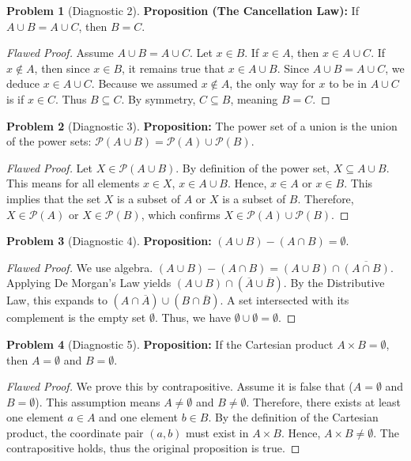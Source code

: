 \documentclass[11pt]{article}
\theoremstyle{definition}
\newtheorem{problem}{Problem}
\begin{document}
\begin{problem}[Diagnostic 2]
\textbf{Proposition (The Cancellation Law):} If $A \cup B = A \cup C$, then $B = C$.
\begin{proof}[Flawed Proof]
Assume $A \cup B = A \cup C$. Let $x \in B$. If $x \in A$, then $x \in A \cup C$. If $x \notin A$, then since $x \in B$, it remains true that $x \in A \cup B$. Since $A \cup B = A \cup C$, we deduce $x \in A \cup C$. Because we assumed $x \notin A$, the only way for $x$ to be in $A \cup C$ is if $x \in C$. Thus $B \subseteq C$. By symmetry, $C \subseteq B$, meaning $B = C$.
\end{proof}
\end{problem}

\begin{problem}[Diagnostic 3]
\textbf{Proposition:} The power set of a union is the union of the power sets: $\mathcal{P}(A \cup B) = \mathcal{P}(A) \cup \mathcal{P}(B)$.
\begin{proof}[Flawed Proof]
Let $X \in \mathcal{P}(A \cup B)$. By definition of the power set, $X \subseteq A \cup B$. This means for all elements $x \in X$, $x \in A \cup B$. Hence, $x \in A$ or $x \in B$. This implies that the set $X$ is a subset of $A$ or $X$ is a subset of $B$. Therefore, $X \in \mathcal{P}(A)$ or $X \in \mathcal{P}(B)$, which confirms $X \in \mathcal{P}(A) \cup \mathcal{P}(B)$.
\end{proof}
\end{problem}

\begin{problem}[Diagnostic 4]
\textbf{Proposition:} $(A \cup B) - (A \cap B) = \emptyset$.
\begin{proof}[Flawed Proof]
We use algebra. $(A \cup B) - (A \cap B) = (A \cup B) \cap \overline{(A \cap B)}$. Applying De Morgan's Law yields $(A \cup B) \cap (\overline{A} \cup \overline{B})$. By the Distributive Law, this expands to $(A \cap \overline{A}) \cup (B \cap \overline{B})$. A set intersected with its complement is the empty set $\emptyset$. Thus, we have $\emptyset \cup \emptyset = \emptyset$. 
\end{proof}
\end{problem}

\begin{problem}[Diagnostic 5]
\textbf{Proposition:} If the Cartesian product $A \times B = \emptyset$, then $A = \emptyset$ and $B = \emptyset$.
\begin{proof}[Flawed Proof]
We prove this by contrapositive. Assume it is false that ($A = \emptyset$ and $B = \emptyset$). This assumption means $A \neq \emptyset$ and $B \neq \emptyset$. Therefore, there exists at least one element $a \in A$ and one element $b \in B$. By the definition of the Cartesian product, the coordinate pair $(a, b)$ must exist in $A \times B$. Hence, $A \times B \neq \emptyset$. The contrapositive holds, thus the original proposition is true.
\end{proof}
\end{problem}
\end{document}
